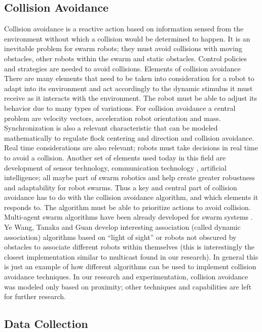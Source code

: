 \documentclass[journal]{IEEEtran}
\begin{document}
\subsection{Collision Avoidance}
Collision avoidance is a reactive action based on information sensed from the environment without which a collision would be determined to happen. It is an inevitable problem for swarm robots; they must avoid collisions with moving obstacles, other robots within the swarm and static obstacles. Control policies and strategies \cite{IG6} are needed to avoid collisions. 
Elements of collision avoidance
There are many elements that need to be taken into consideration for a robot to adapt into its environment and act accordingly to the dynamic stimulus it must receive as it interacts with the environment. The robot must be able to adjust its behavior due to many types of variations. For collision avoidance a central problem are velocity vectors, acceleration \cite{IG9} robot orientation \cite{IG7} and mass. Synchronization \cite{IG8} is also a relevant characteristic that can be modeled mathematically \cite{IG8} to regulate flock centering and direction and collision avoidance.
Real time considerations are also relevant; robots must take decisions in real time to avoid a collision. 
Another set of elements used today in this field are development of sensor technology, communication technology , artificial intelligence; all maybe part of swarm robotics and help create greater robustness and adaptability for robot swarms.
Thus a key and central part of collision avoidance has to do with the collision avoidance algorithm, and which elements it responds to. The algorithm must be able to prioritize actions to avoid collision.  Multi-agent swarm algorithms have been already developed for swarm systems \cite{IG10}. Ye Wang, Tanaka and Guan \cite{IG10} develop interesting association (called dynamic association) algorithms based on “light of sight” or robots not obscured by obstacles to associate different robots within themselves (this is interestingly the closest implementation similar to multicast found in our research). In general this is just an example of how different algorithms can be used to implement collision avoidance techniques. In our research and experimentation, collision avoidance was modeled only based on proximity; other techniques and capabilities are left for further research.

\subsection{Data Collection}
\end{document}

